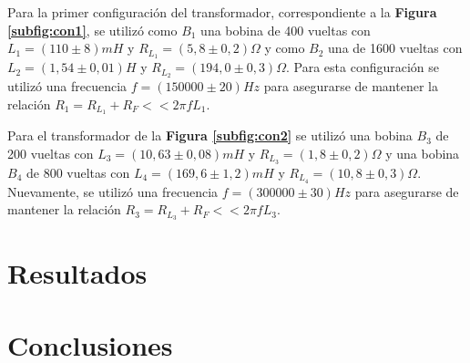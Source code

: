 \documentclass[11pt,a4paper]{article}
\begin{document}
Para la primer configuración del transformador, correspondiente a la \textbf{Figura \ref{subfig:con1}}, se utilizó como $B_1$ una bobina de 400 vueltas con $L_1 = (110 \pm 8)mH$ y $R_{L_1} = (5,8 \pm 0,2)\Omega$ y como $B_2$ una de 1600 vueltas con $L_2 = (1,54 \pm 0,01)H$ y $R_{L_2} = (194,0 \pm 0,3)\Omega$. Para esta configuración se utilizó una frecuencia $f = (150000 \pm 20)Hz$ para asegurarse de mantener la relación $R_1 = R_{L_1}+R_F << 2\pi fL_1$.

Para el transformador de la \textbf{Figura \ref{subfig:con2}} se utilizó una bobina $B_3$ de 200 vueltas con $L_3 = (10,63 \pm 0,08)mH$ y $R_{L_3} = (1,8 \pm 0,2)\Omega$ y una bobina $B_4$ de 800 vueltas con $L_4 = (169,6 \pm 1,2)mH$ y $R_{L_4} = (10,8 \pm 0,3)\Omega$. Nuevamente,  se utilizó una frecuencia $f = (300000 \pm 30)Hz$ para asegurarse de mantener la relación $R_3 = R_{L_3}+R_F << 2\pi fL_3$.




\section{Resultados}
\label{sec:discusion}






\section{Conclusiones}
\label{sec:conclusiones}






\end{document}
